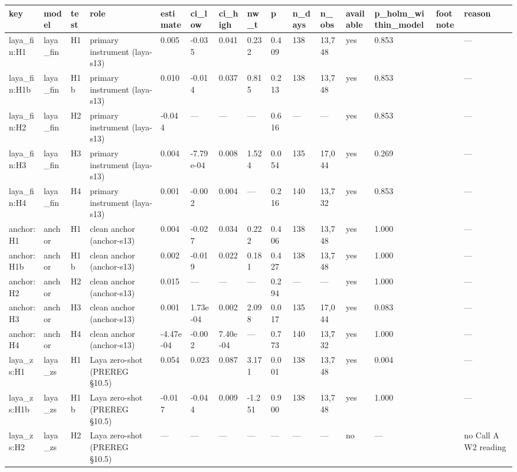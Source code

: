 \begin{tabular}{lllllllllllllll}
\toprule
key & model & test & role & estimate & ci\_low & ci\_high & nw\_t & p & n\_days & n\_obs & available & p\_holm\_within\_model & footnote & reason \\
\midrule
laya\_fin:H1 & laya\_fin & H1 & primary instrument (laya-s13) & 0.005 & -0.035 & 0.041 & 0.232 & 0.409 & 138 & 13,748 & yes & 0.853 &  & — \\
laya\_fin:H1b & laya\_fin & H1b & primary instrument (laya-s13) & 0.010 & -0.014 & 0.037 & 0.815 & 0.213 & 138 & 13,748 & yes & 0.853 &  & — \\
laya\_fin:H2 & laya\_fin & H2 & primary instrument (laya-s13) & -0.044 & — & — & — & 0.616 & — & — & yes & 0.853 &  & — \\
laya\_fin:H3 & laya\_fin & H3 & primary instrument (laya-s13) & 0.004 & -7.79e-04 & 0.008 & 1.524 & 0.054 & 135 & 17,044 & yes & 0.269 &  & — \\
laya\_fin:H4 & laya\_fin & H4 & primary instrument (laya-s13) & 0.001 & -0.002 & 0.004 & — & 0.216 & 140 & 13,732 & yes & 0.853 &  & — \\
anchor:H1 & anchor & H1 & clean anchor (anchor-s13) & 0.004 & -0.027 & 0.034 & 0.222 & 0.406 & 138 & 13,748 & yes & 1.000 &  & — \\
anchor:H1b & anchor & H1b & clean anchor (anchor-s13) & 0.002 & -0.019 & 0.022 & 0.181 & 0.427 & 138 & 13,748 & yes & 1.000 &  & — \\
anchor:H2 & anchor & H2 & clean anchor (anchor-s13) & 0.015 & — & — & — & 0.294 & — & — & yes & 1.000 &  & — \\
anchor:H3 & anchor & H3 & clean anchor (anchor-s13) & 0.001 & 1.73e-04 & 0.002 & 2.098 & 0.017 & 135 & 17,044 & yes & 0.083 &  & — \\
anchor:H4 & anchor & H4 & clean anchor (anchor-s13) & -4.47e-04 & -0.002 & 7.40e-04 & — & 0.773 & 140 & 13,732 & yes & 1.000 &  & — \\
laya\_zs:H1 & laya\_zs & H1 & Laya zero-shot (PREREG §10.5) & 0.054 & 0.023 & 0.087 & 3.171 & 0.001 & 138 & 13,748 & yes & 0.004 &  & — \\
laya\_zs:H1b & laya\_zs & H1b & Laya zero-shot (PREREG §10.5) & -0.017 & -0.044 & 0.009 & -1.251 & 0.900 & 138 & 13,748 & yes & 1.000 &  & — \\
laya\_zs:H2 & laya\_zs & H2 & Laya zero-shot (PREREG §10.5) & — & — & — & — & — & — & — & no & — &  & no Call A W2 reading \\

\end{tabular}
